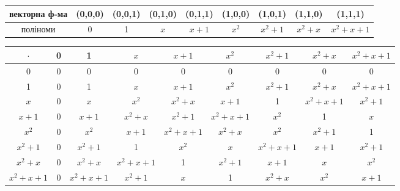 \documentclass[a4paper,12pt]{article}
\begin{document}
\begin{justify}
\begin{enumerate}
\begin{table}[htp]
\begin{tabular}{|c|c|c|c|c|c|c|c|c|}
векторна ф-ма & (0,0,0) & (0,0,1) & (0,1,0) & (0,1,1) & (1,0,0) & (1,0,1) & (1,1,0) & (1,1,1)   \\\hline
поліноми      & 0       & 1       & $x$     & $x+1$   & $x^2$   & $x^2+1$ & $x^2+x$ & $x^2+x+1$\\\hline
\end{tabular}
\end{table}
\begin{table}[htp]\centering
\begin{adjustwidth}{-0.9cm}{}
\begin{tabular}{|c|c|c|c|c|c|c|c|c|}
\hline
$\cdot$   & 0 & 1         & $x$       & $x+1$     & $x^2$     & $x^2+1$   & $x^2+x$   & $x^2+x+1$ \\ \hline
0         & 0 & 0         & 0         & 0         & 0         & 0         & 0         & 0         \\ \hline
1         & 0 & 1         & $x$       & $x+1$     & $x^2$     & $x^2+1$   & $x^2+x$   & $x^2+x+1$ \\ \hline
$x$       & 0 & $x$       & $x^2$     & $x^2+x$   & $x+1$     & 1         & $x^2+x+1$ & $x^2+1$   \\ \hline
$x+1$     & 0 & $x+1$     & $x^2+x$   & $x^2+1$   & $x^2+x+1$ & $x^2$     & 1         & $x$       \\ \hline
$x^2$     & 0 & $x^2$     & $x+1$     & $x^2+x+1$ & $x^2+x$   & $x^2$     & $x^2+1$   & 1         \\ \hline
$x^2+1$   & 0 & $x^2+1$   & 1         & $x^2$     & $x$       & $x^2+x+1$ & $x+1$     & $x^2+1$   \\ \hline
$x^2+x$   & 0 & $x^2+x$   & $x^2+x+1$ & 1         & $x^2+1$   & $x+1$     & $x$       & $x^2$     \\ \hline
$x^2+x+1$ & 0 & $x^2+x+1$ & $x^2+1$   & $x$       & 1         & $x^2+x$   & $x^2$     & $x+1$     \\ \hline
\end{tabular}
\end{adjustwidth}
\end{table}
 		\end{enumerate}
 	\end{justify}
\end{document}
